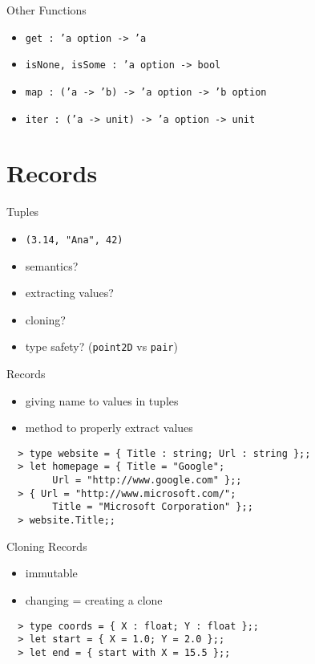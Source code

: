\documentclass{beamer}
\begin{document}
\begin{frame}{Other Functions}
  \begin{itemize}[<+->]
    \item \texttt{get : 'a option -> 'a}
    \item \texttt{isNone, isSome : 'a option -> bool}
    \item \texttt{map : ('a -> 'b) -> 'a option -> 'b option}
    \item \texttt{iter : ('a -> unit) -> 'a option -> unit}
  \end{itemize}
\end{frame}

\section{Records}
\frame{\tableofcontents[currentsection]}

\begin{frame}[label=tuples]{Tuples}
  \begin{itemize}
    \item \texttt{(3.14, "Ana", 42)}
    \item semantics?
    \item extracting values?
    \item cloning?
    \item type safety? (\texttt{point2D} vs \texttt{pair})
  \end{itemize}
\end{frame}

\begin{frame}[fragile]{Records}
  \begin{itemize}
    \item giving name to values in tuples
    \item method to properly extract values
  \end{itemize}
  \begin{verbatim}
  > type website = { Title : string; Url : string };;
  > let homepage = { Title = "Google";
        Url = "http://www.google.com" };;
  > { Url = "http://www.microsoft.com/";
        Title = "Microsoft Corporation" };;
  > website.Title;;
  \end{verbatim}
\end{frame}

\begin{frame}[fragile]{Cloning Records}
  \begin{itemize}
    \item immutable
    \item changing = creating a clone
  \end{itemize}
  \begin{verbatim}
  > type coords = { X : float; Y : float };;
  > let start = { X = 1.0; Y = 2.0 };;
  > let end = { start with X = 15.5 };;
  \end{verbatim}
\end{frame}
\end{document}

